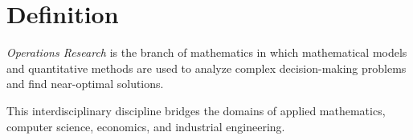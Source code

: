 \section{Definition}

\begin{definition}
    \emph{Operations Research} is the branch of mathematics in which mathematical models and quantitative methods are used to analyze complex decision-making problems and find near-optimal solutions.
\end{definition}
This interdisciplinary discipline bridges the domains of applied mathematics, computer science, economics, and industrial engineering.